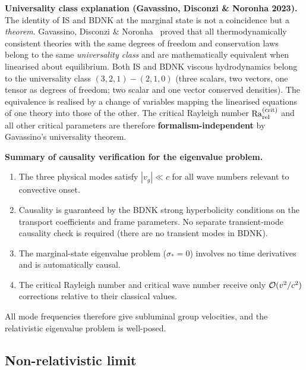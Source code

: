 \begin{relcorrection}
\textbf{Universality class explanation (Gavassino, Disconzi \& Noronha
2023).}  The identity of IS and BDNK at the marginal state is not a
coincidence but a \emph{theorem}.  Gavassino, Disconzi \&
Noronha~\citep{GavassinoUniversality1,GavassinoUniversality2} proved
that all thermodynamically consistent theories with the same degrees of
freedom and conservation laws belong to the same \emph{universality
class} and are mathematically equivalent when linearised about
equilibrium.  Both IS and BDNK viscous hydrodynamics belong to the
universality class $(3,2,1)-(2,1,0)$ (three scalars, two vectors, one
tensor as degrees of freedom; two scalar and one vector conserved
densities).  The equivalence is realised by a change of variables
mapping the linearised equations of one theory into those of the other.
The critical Rayleigh number $\mathrm{Ra}_{\mathrm{rel}}^{(\mathrm{crit})}$ and all other
critical parameters are therefore \textbf{formalism-independent} by
Gavassino's universality theorem.
\end{relcorrection}

\begin{causalitycheck}
\textbf{Summary of causality verification for the eigenvalue problem.}

\begin{enumerate}
\item The three physical modes satisfy
  $|v_g| \ll c$ for all wave numbers relevant to convective onset.

\item Causality is guaranteed by the BDNK strong hyperbolicity conditions
  on the transport coefficients and frame parameters.  No separate
  transient-mode causality check is required (there are no transient modes
  in BDNK).

\item The marginal-state eigenvalue problem ($\sigma_* = 0$) involves no
  time derivatives and is automatically causal.

\item The critical Rayleigh number and critical wave number receive only
  $\mathcal{O}(v^2/c^2)$ corrections relative to their classical values.
\end{enumerate}

All mode frequencies therefore give subluminal group velocities, and the
relativistic eigenvalue problem is well-posed.
\end{causalitycheck}

\subsection{Non-relativistic limit}
\label{sec:rel-12d}

